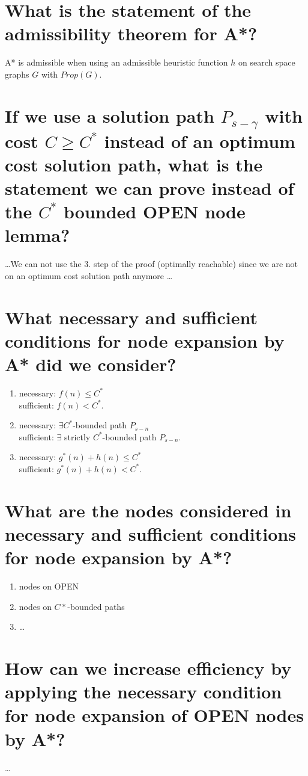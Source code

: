 \documentclass[12pt, a4paper]{article}
\begin{document}
\section{What is the statement of the admissibility theorem for A*?}
A* is admissible when using an admissible heuristic function $h$ on search space graphs $G$ with $Prop(G)$.

\section{If we use a solution path $P_{s-\gamma}$ with cost $C \geq C^*$ instead of an optimum cost solution path, what is the statement we can prove instead of the $C^*$ bounded OPEN node lemma?}

\ldots We can not use the 3. step of the proof (optimally reachable) since we are not on an optimum cost solution path anymore \ldots

\section{What necessary and sufficient conditions for node expansion by A* did we consider?}
\begin{enumerate}
\item necessary: $f(n) \leq C^*$ 
\\ sufficient: $f(n) < C^*$.
\item necessary:  $\exists C^*$-bounded path $P_{s-n}$
\\ sufficient: $\exists$ strictly $C^*$-bounded path $P_{s-n}$.
\item necessary: $g^*(n) + h(n) \leq C^*$
\\ sufficient: $g^*(n) + h(n) < C^*$.
\end{enumerate}

\section{What are the nodes considered in necessary and sufficient conditions for node expansion by A*?}
\begin{enumerate}
\item nodes on OPEN
\item nodes on $C*$-bounded paths
\item \ldots
\end{enumerate}

\section{How can we increase efficiency by applying the necessary condition for node expansion of OPEN nodes by A*?}
\ldots
\end{document}
